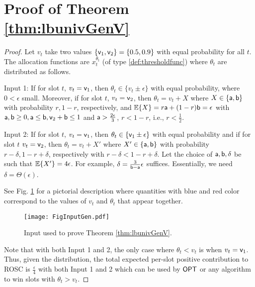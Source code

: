 \section{Proof of Theorem \ref{thm:lbunivGenV}}\label{app:lbnotequal}
\begin{proof}
Let $v_t$ take two values $\{{\mathsf{v}}_1, {\mathsf{v}}_2\} = \{0.5, 0.9\}$ with equal probability for all $t$.  The allocation functions are $x_t^{\theta_t}$ (of type \eqref{def:thresholdfunc}) where $\theta_t$ are distributed as follows.

Input 1: If for slot $t$, $v_t={\mathsf{v}}_1$, then $\theta_t \in \{v_t\pm \epsilon\}$ with equal probability, where $0< \epsilon$ small. Moreover, if  for slot $t$,  $v_t={\mathsf{v}}_2$, then 
$\theta_t = v_t+X$ where $X \in \{{\mathsf{a}},{\mathsf{b}}\}$ with probability $r, 1-r$, respectively, and ${\mathbb{E}}\{X\} = r{\mathsf{a}}+(1-r){\mathsf{b}} = \epsilon$ with ${\mathsf{a}},{\mathsf{b}} \ge 0, {\mathsf{a}}\le {\mathsf{b}} , {\mathsf{v}}_2+{\mathsf{b}} \le 1$ and  ${\mathsf{a}}>\frac{2\epsilon}{3}$, $r<1-r$, i.e., $r< \frac{1}{2}$.

Input 2: If for slot $t$, $v_t={\mathsf{v}}_1$, then $\theta_t \in \{{\mathsf{v}}_1\pm \epsilon\}$ with equal probability and if for slot $t$ $v_t={\mathsf{v}}_2$, then 
$\theta_t = v_t+X'$ where $X'  \in \{{\mathsf{a}},{\mathsf{b}}\}$ with probability $r-\delta , 1-r + \delta $, respectively with $r-\delta <1-r+\delta$. Let the choice of ${\mathsf{a}},{\mathsf{b}},\delta$ be such that ${\mathbb{E}}\{X'\} = 4\epsilon$.
For example, $\delta=\frac{3}{{\mathsf{b}}-{\mathsf{a}}}\epsilon$ suffices. Essentially, we need $\delta=\Theta(\epsilon)$.

See Fig. \ref{fig:inputgen} for a pictorial description where quantities with blue and red color correspond to the values of $v_t$ and $\theta_t$ that appear together.
\begin{figure}
\texttt{[image: FigInputGen.pdf]}
\caption{Input used to prove Theorem \ref{thm:lbunivGenV}.}
\label{fig:inputgen}
\end{figure}

Note that with both Input 1 and  2, the only case where $\theta_t< v_t$ is when $v_t={\mathsf{v}}_1$. Thus, given the distribution, the total expected per-slot positive  contribution to ROSC is $\frac{\epsilon}{4}$ with both Input 1 and  2 which can be used 
by $\mathsf{OPT}$ or any algorithm to win slots with $\theta_t>v_t$.



\end{proof}
